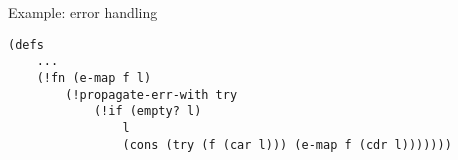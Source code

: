 \begin{frame}[fragile]{Example: error handling}

\begin{verbatim}
(defs
    ...
    (!fn (e-map f l)
        (!propagate-err-with try
            (!if (empty? l)
                l
                (cons (try (f (car l))) (e-map f (cdr l)))))))
\end{verbatim}

\end{frame}


